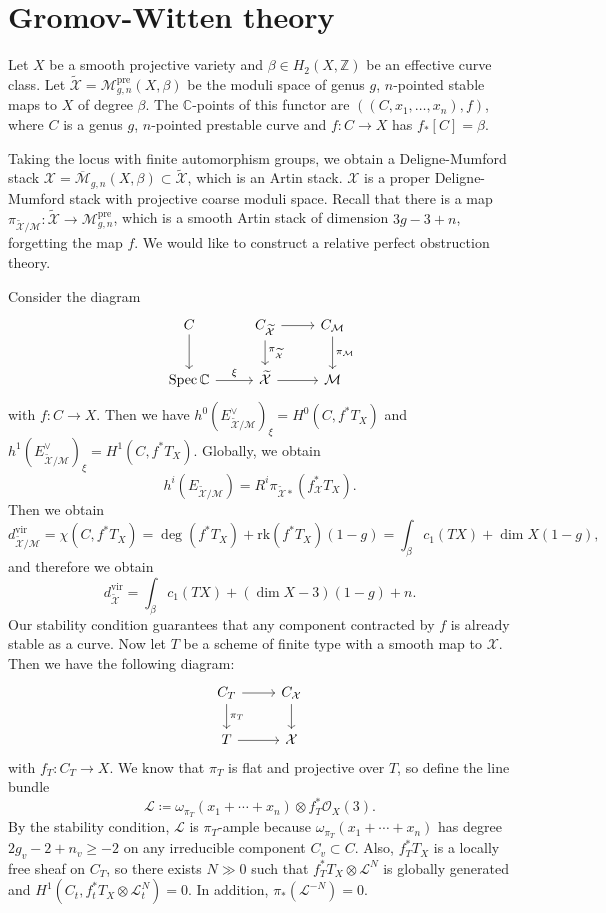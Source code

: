 \documentclass[leqno, openany]{memoir}
\theoremstyle{definition}
\theoremstyle{remark}
\theoremstyle{plain}
\theoremstyle{definition}
\theoremstyle{remark}
\newcommand{\C}{\mathbb{C}}
\newcommand{\Z}{\mathbb{Z}}
\newcommand{\mc}[1]{\mathcal{#1}}
\newcommand{\mr}[1]{\mathrm{#1}}
\newcommand{\ol}[1]{\overline{#1}}
\newcommand{\wt}[1]{\widetilde{#1}}
\DeclareMathOperator{\Spec}{Spec}
\begin{document}
\section{Gromov-Witten theory}

Let $X$ be a smooth projective variety and $\beta \in H_2(X, \Z)$ be an effective curve class. Let $\wt{\mc{X}} = \mc{M}_{g, n}^{\mr{pre}}(X, \beta)$ be the moduli space of genus $g$, $n$-pointed stable maps to $X$ of degree $\beta$. The $\C$-points of this functor are $((C, x_1, \ldots, x_n), f)$, where $C$ is a genus $g$, $n$-pointed prestable curve and $f \colon C \to X$ has $f_* [C] = \beta$.

Taking the locus with finite automorphism groups, we obtain a Deligne-Mumford stack $\mc{X} = \ol{\mc{M}}_{g, n}(X, \beta) \subset \wt{\mc{X}}$, which is an Artin stack. $\mc{X}$ is a proper Deligne-Mumford stack with projective coarse moduli space. Recall that there is a map $\pi_{\wt{\mc{X}}/\mc{M}} \colon \wt{\mc{X}} \to \mc{M}_{g, n}^{\mr{pre}}$, which is a smooth Artin stack of dimension $3g-3 + n$, forgetting the map $f$. We would like to construct a relative perfect obstruction theory.

Consider the diagram
\begin{equation*}
\begin{tikzcd}
    C \ar{d} & C_{\wt{\mc{X}}} \ar{r} \ar{d}{\pi_{\wt{\mc{X}}}} & C_{\mc{M}} \ar{d}{\pi_{\mc{M}}} \\
    \Spec \C \ar{r}{\xi} & \wt{\mc{X}} \ar{r} & \mc{M}
\end{tikzcd}
\end{equation*}
with $f \colon C \to X$. Then we have $h^0(E_{\wt{\mc{X}}/ \mc{M}}^{\vee})_{\xi} = H^0(C, f^* T_X)$ and $h^1(E^{\vee}_{\wt{\mc{X}}/\mc{M}})_{\xi} = H^1(C, f^* T_X)$. Globally, we obtain
\[ h^i(E_{\wt{\mc{X}} / \mc{M}}) = R^i \pi_{\wt{\mc{X}}*}(f_{\mc{X}}^* T_X). \]
Then we obtain 
\[ d_{\wt{\mc{X}}/\mc{M}}^{\mr{vir}} = \chi(C, f^* T_X) = \deg (f^* T_X) + \mr{rk} (f^* T_X)(1-g) = \int_{\beta} c_1(TX) + \dim X (1-g), \]
and therefore we obtain
\[ d_{\wt{\mc{X}}}^{\mr{vir}} = \int_{\beta} c_1(TX) + (\dim X - 3)(1-g) + n. \]
Our stability condition guarantees that any component contracted by $f$ is already stable as a curve. Now let $T$ be a scheme of finite type with a smooth map to $\mc{X}$. Then we have the following diagram:
\begin{equation*}
\begin{tikzcd}
    C_T \ar{d}{\pi_T} \ar{r} & C_{\mc{X}} \ar{d} \\
    T \ar{r} & \mc{X}
\end{tikzcd}
\end{equation*}
with $f_T \colon C_T \to X$. We know that $\pi_T$ is flat and projective over $T$, so define the line bundle
\[ \mc{L} \coloneqq \omega_{\pi_T}(x_1 + \cdots + x_n) \otimes f_T^* \mc{O}_X(3). \]
By the stability condition, $\mc{L}$ is $\pi_T$-ample because $\omega_{\pi_T}(x_1 + \cdots + x_n)$ has degree $2 g_v - 2 + n_v \geq -2$ on any irreducible component $C_v \subset C$. Also, $f_T^* T_X$ is a locally free sheaf on $C_T$, so there exists $N \gg 0$ such that $f_T^* T_X \otimes \mc{L}^N$ is globally generated and $H^1(C_t, f_t^* T_X \otimes \mc{L}_t^N) = 0$. In addition, $\pi_*(\mc{L}^{-N}) = 0$.
\end{document}
